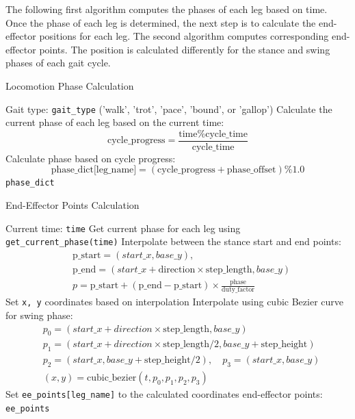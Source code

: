 \documentclass[a4paper,11pt]{article}
\begin{document}
The following first algorithm computes the phases of each leg based on time. Once the phase of each leg is determined, the next step is to calculate the end-effector positions for each leg.
The second algorithm computes corresponding end-effector points. The position is calculated differently for the stance and swing phases of each gait cycle.

\begin{algorithm}[H]
	\caption{Locomotion Phase Calculation}
	\begin{algorithmic}[1]
		\Require Gait type: \texttt{gait\_type} ('walk', 'trot', 'pace', 'bound', or 'gallop')
		\State Calculate the current phase of each leg based on the current time:
		$$
			\text{cycle\_progress} = \frac{\text{time} \% \text{cycle\_time}}{\text{cycle\_time}}
		$$
			\State Calculate phase based on cycle progress:
			$$
				\text{phase\_dict[leg\_name]} = (\text{cycle\_progress} + \text{phase\_offset}) \% 1.0
			$$
		\EndFor
		\State \Return \texttt{phase\_dict}
	\end{algorithmic}
\end{algorithm}

\begin{algorithm}[H]
	\caption{End-Effector Points Calculation}
	\begin{algorithmic}[1]
		\Require Current time: \texttt{time}
		\State Get current phase for each leg using \texttt{get\_current\_phase(time)}
				\State Interpolate between the stance start and end points:
				\begin{align*}
					&\text{p\_start} = (start\_x, base\_y), \\
					&\text{p\_end} = (start\_x + \text{direction} \times \text{step\_length}, base\_y) \\
					&p = \text{p\_start} + (\text{p\_end} - \text{p\_start}) \times \frac{\text{phase}}{\text{duty\_factor}}
				\end{align*}
				\State Set \texttt{x, y} coordinates based on interpolation
			\Else
				\State Interpolate using cubic Bezier curve for swing phase:
				\begin{align*}
					&p_0 = (start\_x + direction \times \text{step\_length}, base\_y) \\
					&p_1 = (start\_x + direction \times \text{step\_length}/2, base\_y + \text{step\_height}) \\
					&p_2 = (start\_x, base\_y + \text{step\_height}/2), \quad p_3 = (start\_x, base\_y) \\
					&(x, y) = \text{cubic\_bezier}(t, p_0, p_1, p_2, p_3)
				\end{align*}
			\EndIf
			\State Set \texttt{ee\_points[leg\_name]} to the calculated coordinates
		\EndFor
		\State \Return end-effector points: \texttt{ee\_points}
	\end{algorithmic}
\end{algorithm}
\end{document}
